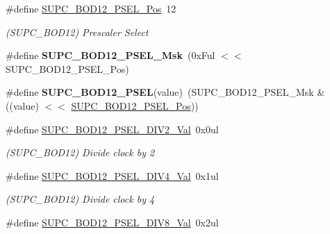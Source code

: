 \begin{DoxyCompactItemize}
\item 
\hypertarget{group___s_a_m_l21___s_u_p_c_ga43d50cdce3fb9ed37bfc9007dccac0d2}{}\#define \hyperlink{group___s_a_m_l21___s_u_p_c_ga43d50cdce3fb9ed37bfc9007dccac0d2}{S\+U\+P\+C\+\_\+\+B\+O\+D12\+\_\+\+P\+S\+E\+L\+\_\+\+Pos}~12\label{group___s_a_m_l21___s_u_p_c_ga43d50cdce3fb9ed37bfc9007dccac0d2}

\begin{DoxyCompactList}\small\item\em (S\+U\+P\+C\+\_\+\+B\+O\+D12) Prescaler Select \end{DoxyCompactList}\item 
\hypertarget{group___s_a_m_l21___s_u_p_c_ga133fccd4f696451b78fcaf2287555f59}{}\#define {\bfseries S\+U\+P\+C\+\_\+\+B\+O\+D12\+\_\+\+P\+S\+E\+L\+\_\+\+Msk}~(0x\+Ful $<$$<$ S\+U\+P\+C\+\_\+\+B\+O\+D12\+\_\+\+P\+S\+E\+L\+\_\+\+Pos)\label{group___s_a_m_l21___s_u_p_c_ga133fccd4f696451b78fcaf2287555f59}

\item 
\hypertarget{group___s_a_m_l21___s_u_p_c_gae34363898e427366616fc7a4c9e48da2}{}\#define {\bfseries S\+U\+P\+C\+\_\+\+B\+O\+D12\+\_\+\+P\+S\+E\+L}(value)~(S\+U\+P\+C\+\_\+\+B\+O\+D12\+\_\+\+P\+S\+E\+L\+\_\+\+Msk \& ((value) $<$$<$ \hyperlink{group___s_a_m_l21___s_u_p_c_ga43d50cdce3fb9ed37bfc9007dccac0d2}{S\+U\+P\+C\+\_\+\+B\+O\+D12\+\_\+\+P\+S\+E\+L\+\_\+\+Pos}))\label{group___s_a_m_l21___s_u_p_c_gae34363898e427366616fc7a4c9e48da2}

\item 
\hypertarget{group___s_a_m_l21___s_u_p_c_ga08fa9ddbf10c1f608ad9c7515f30977f}{}\#define \hyperlink{group___s_a_m_l21___s_u_p_c_ga08fa9ddbf10c1f608ad9c7515f30977f}{S\+U\+P\+C\+\_\+\+B\+O\+D12\+\_\+\+P\+S\+E\+L\+\_\+\+D\+I\+V2\+\_\+\+Val}~0x0ul\label{group___s_a_m_l21___s_u_p_c_ga08fa9ddbf10c1f608ad9c7515f30977f}

\begin{DoxyCompactList}\small\item\em (S\+U\+P\+C\+\_\+\+B\+O\+D12) Divide clock by 2 \end{DoxyCompactList}\item 
\hypertarget{group___s_a_m_l21___s_u_p_c_ga31a86999e9c11882c01b45e0692dc897}{}\#define \hyperlink{group___s_a_m_l21___s_u_p_c_ga31a86999e9c11882c01b45e0692dc897}{S\+U\+P\+C\+\_\+\+B\+O\+D12\+\_\+\+P\+S\+E\+L\+\_\+\+D\+I\+V4\+\_\+\+Val}~0x1ul\label{group___s_a_m_l21___s_u_p_c_ga31a86999e9c11882c01b45e0692dc897}

\begin{DoxyCompactList}\small\item\em (S\+U\+P\+C\+\_\+\+B\+O\+D12) Divide clock by 4 \end{DoxyCompactList}\item 
\hypertarget{group___s_a_m_l21___s_u_p_c_gaa5d5f4d26bee994b999d908ba80675d7}{}\#define \hyperlink{group___s_a_m_l21___s_u_p_c_gaa5d5f4d26bee994b999d908ba80675d7}{S\+U\+P\+C\+\_\+\+B\+O\+D12\+\_\+\+P\+S\+E\+L\+\_\+\+D\+I\+V8\+\_\+\+Val}~0x2ul\label{group___s_a_m_l21___s_u_p_c_gaa5d5f4d26bee994b999d908ba80675d7}


\end{DoxyCompactItemize}
